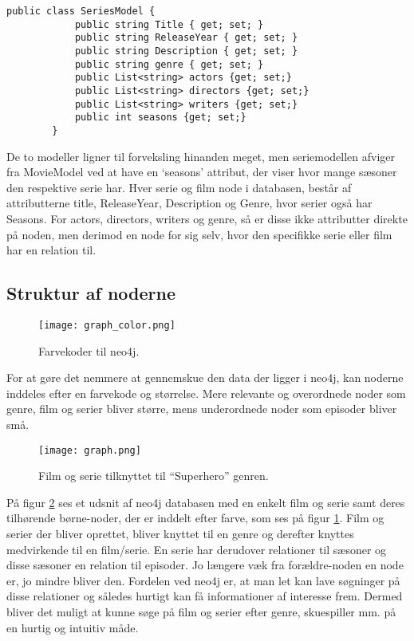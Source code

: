 \begin{tcolorbox}
    \lstset{style=sharpstyle}
    \begin{lstlisting}[language={[Sharp]C}, caption={C\# Seriesodel Class}, label={lst:series}]
        public class SeriesModel {
            public string Title { get; set; }
            public string ReleaseYear { get; set; }
            public string Description { get; set; }
            public string genre { get; set; }
            public List<string> actors {get; set;}
            public List<string> directors {get; set;}
            public List<string> writers {get; set;}
            public int seasons {get; set;}
        }
    \end{lstlisting}
\end{tcolorbox}
De to modeller ligner til forveksling hinanden meget, men seriemodellen afviger fra MovieModel ved at have en ‘seasons’ attribut, der viser hvor mange sæsoner den respektive serie har. Hver serie og film node i databasen, består af attributterne title, ReleaseYear, Description og Genre, hvor serier også har Seasons. For actors, directors, writers og genre, så er disse ikke attributter direkte på noden, men derimod en node for sig selv, hvor den specifikke serie eller film har en relation til. 

\subsection*{Struktur af noderne}
\begin{figure}[H]
    \centering
    \texttt{[image: graph\_color.png]}
    \caption{Farvekoder til neo4j.}
    \label{fig::graph_color}
\end{figure}
For at gøre det nemmere at gennemskue den data der ligger i neo4j, kan noderne inddeles efter en farvekode og størrelse. Mere relevante og overordnede noder som genre, film og serier bliver større, mens underordnede noder som episoder bliver små. 

\begin{figure}[H]
    \centering
    \texttt{[image: graph.png]}
    \caption{Film og serie tilknyttet til “Superhero” genren.}
    \label{fig::graph}
\end{figure}
På figur \ref{fig::graph} ses et udsnit af neo4j databasen med en enkelt film og serie samt deres tilhørende børne-noder, der er inddelt efter farve, som ses på figur \ref{fig::graph_color}. Film og serier der bliver oprettet, bliver knyttet til en genre og derefter knyttes medvirkende til en film/serie. En serie har derudover relationer til sæsoner og disse sæsoner en relation til episoder. Jo længere væk fra forældre-noden en node er, jo mindre bliver den. Fordelen ved neo4j er, at man let kan lave søgninger på disse relationer og således hurtigt kan få informationer af interesse frem. Dermed bliver det muligt at kunne søge på film og serier efter genre, skuespiller mm. på en hurtig og intuitiv måde.